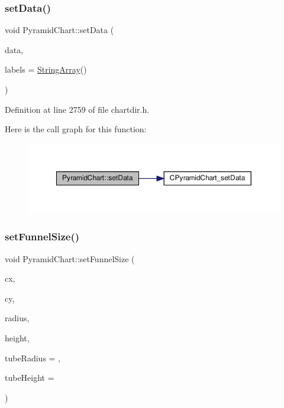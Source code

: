 \subsubsection{\texorpdfstring{set\+Data()}{setData()}}
{\footnotesize\ttfamily void Pyramid\+Chart\+::set\+Data (\begin{DoxyParamCaption}\item[{\hyperlink{class_double_array}{Double\+Array}}]{data,  }\item[{\hyperlink{class_string_array}{String\+Array}}]{labels = {\ttfamily \hyperlink{class_string_array}{String\+Array}()} }\end{DoxyParamCaption})\hspace{0.3cm}{\ttfamily [inline]}}



Definition at line 2759 of file chartdir.\+h.

Here is the call graph for this function\+:
\nopagebreak
\begin{figure}[H]
\begin{center}
\leavevmode
\includegraphics[width=350pt]{class_pyramid_chart_aac92f3377d6e2a7241480a16ff775a5d_cgraph}
\end{center}
\end{figure}
\mbox{\label{class_pyramid_chart_a17f068885ee414fc5113ae1063bf0e39}} 
\subsubsection{\texorpdfstring{set\+Funnel\+Size()}{setFunnelSize()}}
{\footnotesize\ttfamily void Pyramid\+Chart\+::set\+Funnel\+Size (\begin{DoxyParamCaption}\item[{int}]{cx,  }\item[{int}]{cy,  }\item[{int}]{radius,  }\item[{int}]{height,  }\item[{double}]{tube\+Radius = {},  }\item[{double}]{tube\+Height = {} }\end{DoxyParamCaption})\hspace{0.3cm}{\ttfamily [inline]}}



